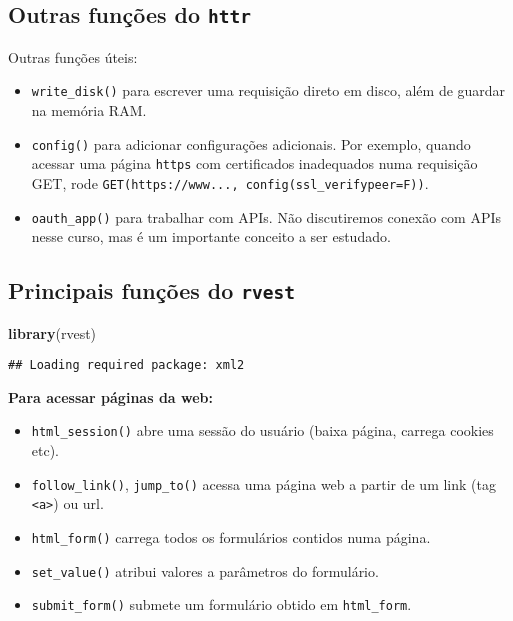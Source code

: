 \documentclass[]{book}
\newenvironment{Shaded}{\begin{snugshade}}{\end{snugshade}}
\newcommand{\KeywordTok}[1]{\textcolor[rgb]{0.13,0.29,0.53}{\textbf{{#1}}}}
\newcommand{\NormalTok}[1]{{#1}}
\providecommand{\tightlist}{%
  \setlength{\itemsep}{0pt}\setlength{\parskip}{0pt}}
\begin{document}
\subsection{\texorpdfstring{Outras funções do
\texttt{httr}}{Outras funções do httr}}\label{outras-funcoes-do-httr}

Outras funções úteis:

\begin{itemize}
\tightlist
\item
  \texttt{write\_disk()} para escrever uma requisição direto em disco,
  além de guardar na memória RAM.
\item
  \texttt{config()} para adicionar configurações adicionais. Por
  exemplo, quando acessar uma página \texttt{https} com certificados
  inadequados numa requisição GET, rode
  \texttt{GET(\textquotesingle{}https://www...\textquotesingle{},\ config(ssl\_verifypeer=F))}.
\item
  \texttt{oauth\_app()} para trabalhar com APIs. Não discutiremos
  conexão com APIs nesse curso, mas é um importante conceito a ser
  estudado.
\end{itemize}

\subsection{\texorpdfstring{Principais funções do
\texttt{rvest}}{Principais funções do rvest}}\label{principais-funcoes-do-rvest}

\begin{Shaded}
\begin{Highlighting}[]
\KeywordTok{library}\NormalTok{(rvest)}
\end{Highlighting}
\end{Shaded}

\begin{verbatim}
## Loading required package: xml2
\end{verbatim}

\textbf{Para acessar páginas da web:}

\begin{itemize}
\tightlist
\item
  \texttt{html\_session()} abre uma sessão do usuário (baixa página,
  carrega cookies etc).
\item
  \texttt{follow\_link()}, \texttt{jump\_to()} acessa uma página web a
  partir de um link (tag \texttt{\textless{}a\textgreater{}}) ou url.
\item
  \texttt{html\_form()} carrega todos os formulários contidos numa
  página.
\item
  \texttt{set\_value()} atribui valores a parâmetros do formulário.
\item
  \texttt{submit\_form()} submete um formulário obtido em
  \texttt{html\_form}.
\end{itemize}
\end{document}
